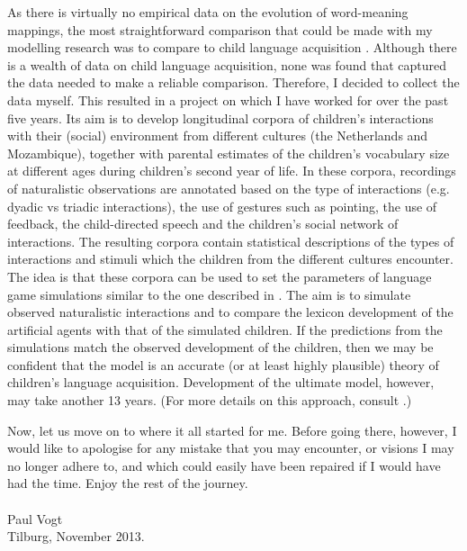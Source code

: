 As there is virtually no empirical data on the evolution of word-meaning mappings, the most straightforward comparison that could be made with my modelling research was to compare to child language acquisition \citep{vogtlieven:2010}. Although there is a wealth of data on child language acquisition, none was found that captured the data needed to make a reliable comparison. Therefore, I decided to collect the data myself. This resulted in a project on which I have worked for over the past five years. Its aim is to develop longitudinal corpora of children's interactions with their (social) environment from different cultures (the Netherlands and Mozambique), together with parental estimates of the children's vocabulary size at different ages during children's second year of life. In these corpora, recordings of naturalistic observations are annotated based on the type of interactions (e.g. dyadic vs triadic interactions), the use of gestures such as pointing, the use of feedback, the child-directed speech and the children's social network of interactions. The resulting corpora  contain statistical descriptions of the types of interactions and stimuli which the children from the different cultures encounter. The idea is that these corpora can be used to set the parameters of language game simulations similar to the one described in \citet{vogthaasdijk:2010}. The aim is to simulate observed naturalistic interactions and to compare the lexicon development of the artificial agents with that of the simulated children. If the predictions from the simulations match the observed development of the children, then we may be confident that the model is an accurate (or at least highly plausible) theory of children's language acquisition. Development of the ultimate model, however, may take another 13 years. (For more details on this approach, consult \citet{vogtmastin:2013}.)

 
Now, let us move on to where it all started for me. Before going there, however, I would like to apologise for any mistake that you may encounter, or visions I may no longer adhere to, and which could easily have been repaired if I would have had the time. Enjoy the rest of the journey.\\
\\
\noindent Paul Vogt\\
\noindent Tilburg, November 2013.
